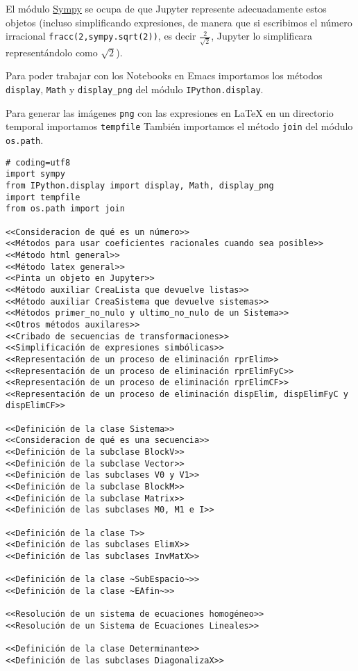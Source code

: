 \documentclass[11pt]{report}
\begin{document}
El módulo \href{https://www.sympy.org/en/index.html}{Sympy} se ocupa de que Jupyter represente adecuadamente estos
objetos (incluso simplificando expresiones, de manera que si
escribimos el número irracional \texttt{fracc(2,sympy.sqrt(2))}, es decir
\(\frac{2}{\sqrt{2}}\), Jupyter lo simplificara representándolo como
\(\sqrt{2}\)).

Para poder trabajar con los Notebooks en Emacs importamos los métodos
\texttt{display}, \texttt{Math} y \texttt{display\_png} del módulo \texttt{IPython.display}.

Para generar las imágenes \texttt{png} con las expresiones en \LaTeX{} en un
directorio temporal importamos \texttt{tempfile}
También importamos el método \texttt{join} del módulo \texttt{os.path}.
\begin{verbatim}
# coding=utf8
import sympy
from IPython.display import display, Math, display_png
import tempfile
from os.path import join           

<<Consideracion de qué es un número>>
<<Métodos para usar coeficientes racionales cuando sea posible>>
<<Método html general>>
<<Método latex general>>
<<Pinta un objeto en Jupyter>>
<<Método auxiliar CreaLista que devuelve listas>>
<<Método auxiliar CreaSistema que devuelve sistemas>>
<<Métodos primer_no_nulo y ultimo_no_nulo de un Sistema>>
<<Otros métodos auxilares>>
<<Cribado de secuencias de transformaciones>>
<<Simplificación de expresiones simbólicas>>
<<Representación de un proceso de eliminación rprElim>>
<<Representación de un proceso de eliminación rprElimFyC>>
<<Representación de un proceso de eliminación rprElimCF>>
<<Representación de un proceso de eliminación dispElim, dispElimFyC y dispElimCF>>

<<Definición de la clase Sistema>>
<<Consideracion de qué es una secuencia>>
<<Definición de la subclase BlockV>>
<<Definición de la subclase Vector>>
<<Definición de las subclases V0 y V1>>
<<Definición de la subclase BlockM>>
<<Definición de la subclase Matrix>>
<<Definición de las subclases M0, M1 e I>>

<<Definición de la clase T>>
<<Definición de las subclases ElimX>>
<<Definición de las subclases InvMatX>>

<<Definición de la clase ~SubEspacio~>>
<<Definición de la clase ~EAfin~>>

<<Resolución de un sistema de ecuaciones homogéneo>>
<<Resolución de un Sistema de Ecuaciones Lineales>>

<<Definición de la clase Determinante>>
<<Definición de las subclases DiagonalizaX>>
\end{verbatim}
\end{document}
